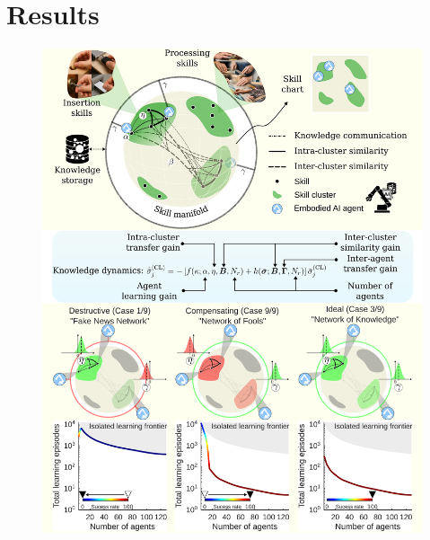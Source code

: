 \documentclass[12pt]{article}
\begin{document}
\section*{Results}\label{sec_use_case}
\begin{figure}[t!]
	\centering
	\hspace*{\fill}
	\includegraphics[width=14cm]{collective_learning_and_skill_manifold_conceptualization.png}
	\hspace*{\fill}
	

\end{figure}
\end{document}
